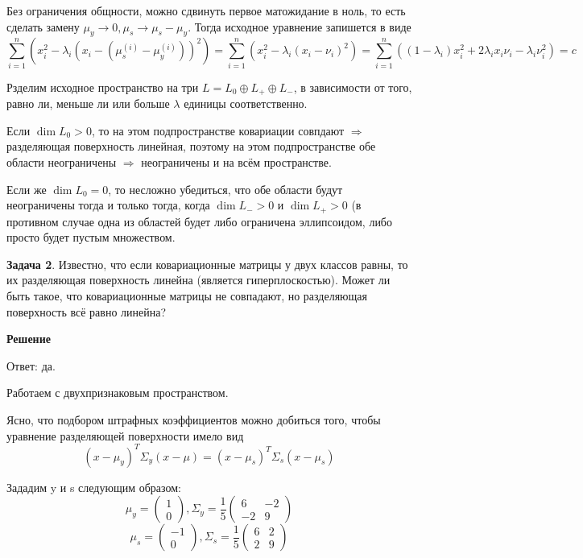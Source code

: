 Без ограничения общности, можно сдвинуть первое матожидание в ноль, то есть сделать замену $\mu_y \longrightarrow 0, \mu_{s} \longrightarrow \mu_{s} - \mu_{y}$. Тогда исходное уравнение запишется в виде \[\sum_{i=1}^{n}(x_{i}^2 - \lambda_{i}(x_{i} - (\mu_{s}^{(i)} - \mu_{y}^{(i)}))^2) = \sum_{i=1}^{n}(x_{i}^2 - \lambda_{i}(x_{i} - \nu_{i})^2) = \sum_{i=1}^{n}((1-\lambda_i)x_{i}^2 + 2\lambda_{i}x_{i}\nu_{i} - \lambda_{i}\nu_{i}^2) = c\]

Рзделим исходное пространство на три $L = L_0 \oplus L_+ \oplus L_-$, в зависимости от того, равно ли, меньше ли или больше $\lambda$ единицы соответственно.

Если $\dim L_0 > 0$, то на этом подпространстве ковариации совпдают $\Longrightarrow$ разделяющая поверхность линейная, поэтому на этом подпространстве обе области неограничены $\Longrightarrow$ неограничены и на всём пространстве.

Если же $\dim L_0 = 0$, то несложно убедиться, что обе области будут неограничены тогда и только тогда, когда $\dim L_- > 0$ и $\dim L_+ > 0$ (в противном случае одна из областей будет либо ограничена эллипсоидом, либо просто будет пустым множеством.


\textbf{Задача 2}. Известно, что если ковариационные матрицы у двух классов равны, то их разделяющая поверхность линейна (является гиперплоскостью). Может ли быть такое, что ковариационные матрицы не совпадают, но разделяющая поверхность всё равно линейна?

\textbf{Решение}

Ответ: да.

Работаем с двухпризнаковым пространством.

Ясно, что подбором штрафных коэффициентов можно добиться того, чтобы уравнение разделяющей поверхности имело вид \[(x-\mu_{y})^{T}\Sigma_{y}(x-\mu) = (x-\mu_{s})^{T}\Sigma_{s}(x-\mu_{s})\]

Зададим y и s следующим образом: \[\begin{equation*}
        \mu_y = \begin{pmatrix}
            1 \\
            0
        \end{pmatrix},
        \Sigma_y = \frac{1}{5}
        \begin{pmatrix}
            6  & -2 \\
            -2 & 9
        \end{pmatrix}
    \end{equation*}\]
\[\begin{equation*}
        \mu_s = \begin{pmatrix}
            -1 \\
            0
        \end{pmatrix},
        \Sigma_s = \frac{1}{5}
        \begin{pmatrix}
            6 & 2 \\
            2 & 9
        \end{pmatrix}
    \end{equation*}\]

